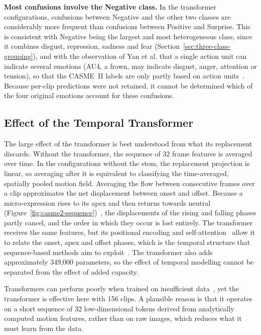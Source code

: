 \textbf{Most confusions involve the Negative class.} In the transformer configurations, confusions between Negative and the other two classes are considerably more frequent than confusions between Positive and Surprise. This is consistent with Negative being the largest and most heterogeneous class, since it combines disgust, repression, sadness and fear (Section~\ref{sec:three-class-grouping}), and with the observation of Yan et al. that a single action unit can indicate several emotions (AU4, a frown, may indicate disgust, anger, attention or tension), so that the CASME~II labels are only partly based on action units~\cite{yan2014}. Because per-clip predictions were not retained, it cannot be determined which of the four original emotions account for these confusions.

\subsection{Effect of the Temporal Transformer}
\label{sec:transformer-interpretation}

The large effect of the transformer is best understood from what its replacement discards. Without the transformer, the sequence of 32 frame features is averaged over time. In the configurations without the stem, the replacement projection is linear, so averaging after it is equivalent to classifying the time-averaged, spatially pooled motion field. Averaging the flow between consecutive frames over a clip approximates the net displacement between onset and offset. Because a micro-expression rises to its apex and then returns towards neutral (Figure~\ref{fig:casme2-sequence})~\cite{yan2014}, the displacements of the rising and falling phases partly cancel, and the order in which they occur is lost entirely. The transformer receives the same features, but its positional encoding and self-attention~\cite{vaswani2017} allow it to relate the onset, apex and offset phases, which is the temporal structure that sequence-based methods aim to exploit~\cite{zhang2022,xia2020a}. The transformer also adds approximately 349,000 parameters, so the effect of temporal modelling cannot be separated from the effect of added capacity.

Transformers can perform poorly when trained on insufficient data~\cite{dosovitskiy2021}, yet the transformer is effective here with 156 clips. A plausible reason is that it operates on a short sequence of 32 low-dimensional tokens derived from analytically computed motion features, rather than on raw images, which reduces what it must learn from the data.

